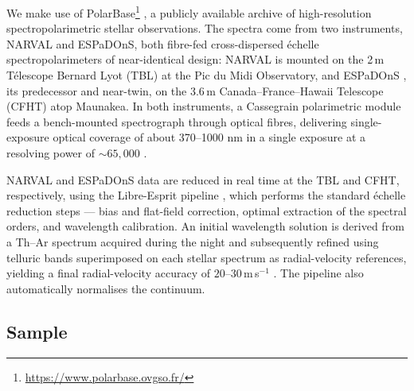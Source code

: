 
We make use of PolarBase\footnote{\url{https://www.polarbase.ovgso.fr/}} \citep{polarbase1, polarbase2}, a publicly available archive of high-resolution spectropolarimetric stellar observations. The spectra come from two instruments, NARVAL and ESPaDOnS, both fibre-fed cross-dispersed \'echelle spectropolarimeters of near-identical design: NARVAL \citep{narval} is mounted on the 2\,m T\'elescope Bernard Lyot (TBL) at the Pic du Midi Observatory, and ESPaDOnS \citep{espadons}, its predecessor and near-twin, on the 3.6\,m Canada--France--Hawaii Telescope (CFHT) atop Maunakea. In both instruments, a Cassegrain polarimetric module feeds a bench-mounted spectrograph through optical fibres, delivering single-exposure optical coverage of about 370–1000 nm in a single exposure at a resolving power of ${\sim}65{,}000$ \citep{narval, espadons, polarbase1}.

NARVAL and ESPaDOnS data are reduced in real time at the TBL and CFHT, respectively, using the Libre-Esprit pipeline \citep{polarbase2}, which performs the standard \'echelle reduction steps --- bias and flat-field correction, optimal extraction of the spectral orders, and wavelength calibration. An initial wavelength solution is derived from a Th--Ar spectrum acquired during the night and subsequently refined using telluric bands superimposed on each stellar spectrum as radial-velocity references, yielding a final radial-velocity accuracy of $20$--$30$\,m\,s$^{-1}$ \citep{instrument_reduction_pipeline}. The pipeline also automatically normalises the continuum.

\subsection{Sample}
\label{sec:obs_sample}


